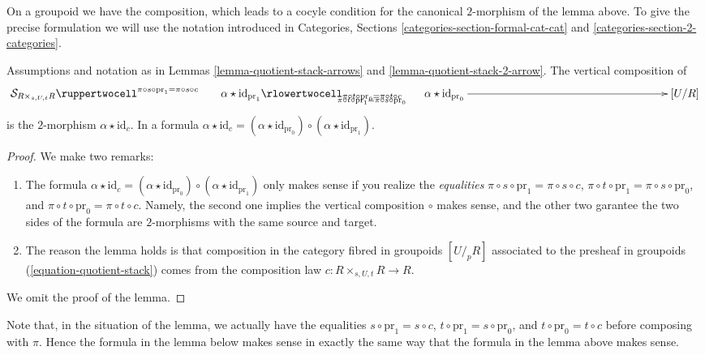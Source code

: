 \noindent
On a groupoid we have the composition, which leads to a cocyle
condition for the canonical $2$-morphism of the lemma above.
To give the precise formulation we will use the notation introduced in
Categories, Sections \ref{categories-section-formal-cat-cat} and
\ref{categories-section-2-categories}.

\begin{lemma}
\label{lemma-quotient-stack-cocycle}
Assumptions and notation as in
Lemmas \ref{lemma-quotient-stack-arrows} and
\ref{lemma-quotient-stack-2-arrow}.
The vertical composition of
$$
\xymatrixcolsep{15pc}
\xymatrix{
\mathcal{S}_{R \times_{s, U, t} R}
\ruppertwocell^{\pi \circ s \circ \text{pr}_1 = \pi \circ s \circ c}%
{\ \ \ \ \ \ \alpha \star \text{id}_{\text{pr}_1}}
\ar[r]_(.3){\pi \circ t \circ \text{pr}_1 = \pi \circ s \circ \text{pr}_0}
\rlowertwocell_{\pi \circ t \circ \text{pr}_0 = \pi \circ t \circ c}%
{\ \ \ \ \ \ \alpha \star \text{id}_{\text{pr}_0}}
&
[U/R]
}
$$
is the $2$-morphism $\alpha \star \text{id}_c$. In a formula
$\alpha \star \text{id}_c =
(\alpha \star \text{id}_{\text{pr}_0})
\circ
(\alpha \star \text{id}_{\text{pr}_1})
$.
\end{lemma}

\begin{proof}
We make two remarks:
\begin{enumerate}
\item The formula
$\alpha \star \text{id}_c = (\alpha \star \text{id}_{\text{pr}_0}) \circ
(\alpha \star \text{id}_{\text{pr}_1})$ only makes sense if you realize
the {\it equalities} $\pi \circ s \circ \text{pr}_1 = \pi \circ s \circ c$,
$\pi \circ t \circ \text{pr}_1 = \pi \circ s \circ \text{pr}_0$, and
$\pi \circ t \circ \text{pr}_0 = \pi \circ t \circ c$. Namely, the second
one implies the vertical composition $\circ$ makes sense, and the other
two garantee the two sides of the formula are $2$-morphisms with the
same source and target.
\item The reason the lemma holds is that composition in the
category fibred in groupoids $[U/_{\!p}R]$ associated to the presheaf
in groupoids (\ref{equation-quotient-stack}) comes from the composition
law $c : R \times_{s, U, t} R \to R$.
\end{enumerate}
We omit the proof of the lemma.
\end{proof}

\noindent
Note that, in the situation of the lemma, we actually have the equalities
$s \circ \text{pr}_1 = s \circ c$,
$t \circ \text{pr}_1 = s \circ \text{pr}_0$, and
$t \circ \text{pr}_0 = t \circ c$ before composing with $\pi$.
Hence the formula in the lemma below makes sense in exactly the same way
that the formula in the lemma above makes sense.

